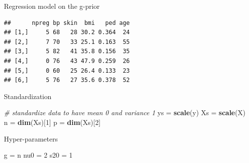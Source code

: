 \documentclass[ignorenonframetext,]{beamer}
\newenvironment{Shaded}{\begin{snugshade}}{\end{snugshade}}
\newcommand{\KeywordTok}[1]{\textcolor[rgb]{0.13,0.29,0.53}{\textbf{#1}}}
\newcommand{\DecValTok}[1]{\textcolor[rgb]{0.00,0.00,0.81}{#1}}
\newcommand{\StringTok}[1]{\textcolor[rgb]{0.31,0.60,0.02}{#1}}
\newcommand{\CommentTok}[1]{\textcolor[rgb]{0.56,0.35,0.01}{\textit{#1}}}
\newcommand{\OperatorTok}[1]{\textcolor[rgb]{0.81,0.36,0.00}{\textbf{#1}}}
\newcommand{\NormalTok}[1]{#1}
\begin{document}
\begin{frame}[fragile]{Regression model on the g-prior}

\begin{Shaded}
\end{Shaded}

\begin{verbatim}
##      npreg bp skin  bmi   ped age
## [1,]     5 68   28 30.2 0.364  24
## [2,]     7 70   33 25.1 0.163  55
## [3,]     5 82   41 35.8 0.156  35
## [4,]     0 76   43 47.9 0.259  26
## [5,]     0 60   25 26.4 0.133  23
## [6,]     5 76   27 35.6 0.378  52
\end{verbatim}

\end{frame}

\begin{frame}[fragile]{Standardization}

\begin{Shaded}
\begin{Highlighting}[]
\CommentTok{# standardize data to have mean 0 and variance 1}
\NormalTok{ys =}\StringTok{ }\KeywordTok{scale}\NormalTok{(y)}
\NormalTok{Xs =}\StringTok{ }\KeywordTok{scale}\NormalTok{(X)}
\NormalTok{n =}\StringTok{ }\KeywordTok{dim}\NormalTok{(Xs)[}\DecValTok{1}\NormalTok{]}
\NormalTok{p =}\StringTok{ }\KeywordTok{dim}\NormalTok{(Xs)[}\DecValTok{2}\NormalTok{]}
\end{Highlighting}
\end{Shaded}

\end{frame}

\begin{frame}[fragile]{Hyper-parameters}

\begin{Shaded}
\begin{Highlighting}[]
\NormalTok{g =}\StringTok{ }\NormalTok{n}
\NormalTok{nu0 =}\StringTok{ }\DecValTok{2}
\NormalTok{s20 =}\StringTok{ }\DecValTok{1}
\end{Highlighting}
\end{Shaded}

\end{frame}
\end{document}
